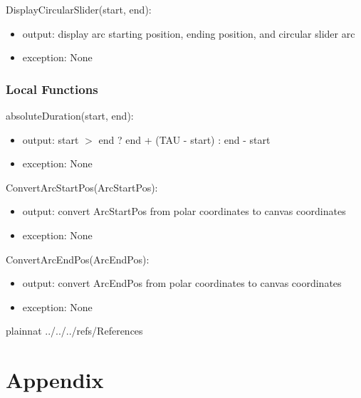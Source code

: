 \documentclass[12pt, titlepage]{article}
\begin{document}
\noindent DisplayCircularSlider(start, end):
\begin{itemize}
	\item output: display arc starting position, ending position, and circular slider arc
	\item exception: None
\end{itemize}

\subsubsection{Local Functions}

\noindent absoluteDuration(start, end):
\begin{itemize}
	\item output: start $>$ end ? end + (TAU - start) : end - start  
	\item exception: None 
\end{itemize}

\noindent ConvertArcStartPos(ArcStartPos):
\begin{itemize}
	\item output: convert ArcStartPos from polar coordinates to canvas coordinates 
	\item exception: None 
\end{itemize}

\noindent ConvertArcEndPos(ArcEndPos):
\begin{itemize}
	\item output: convert ArcEndPos from polar coordinates to canvas coordinates 
	\item exception: None 
\end{itemize}

\newpage

 {plainnat}
 {../../../refs/References}

\newpage

\section{Appendix} \label{Appendix}

\end{document}
